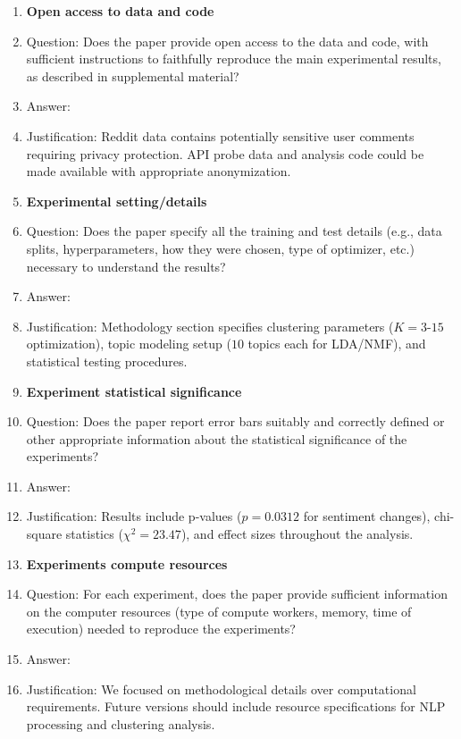\documentclass{article}
\begin{document}
\begin{enumerate}
\item {\bf Open access to data and code}
    \item[] Question: Does the paper provide open access to the data and code, with sufficient instructions to faithfully reproduce the main experimental results, as described in supplemental material?
    \item[] Answer: \answerNo{} 
    \item[] Justification: Reddit data contains potentially sensitive user comments requiring privacy protection. API probe data and analysis code could be made available with appropriate anonymization.

\item {\bf Experimental setting/details}
    \item[] Question: Does the paper specify all the training and test details (e.g., data splits, hyperparameters, how they were chosen, type of optimizer, etc.) necessary to understand the results?
    \item[] Answer: \answerYes{} 
    \item[] Justification: Methodology section specifies clustering parameters ($K=3$-$15$ optimization), topic modeling setup ($10$ topics each for LDA/NMF), and statistical testing procedures.

\item {\bf Experiment statistical significance}
    \item[] Question: Does the paper report error bars suitably and correctly defined or other appropriate information about the statistical significance of the experiments?
    \item[] Answer: \answerYes{} 
    \item[] Justification: Results include p-values ($p=0.0312$ for sentiment changes), chi-square statistics ($\chi^2=23.47$), and effect sizes throughout the analysis.

\item {\bf Experiments compute resources}
    \item[] Question: For each experiment, does the paper provide sufficient information on the computer resources (type of compute workers, memory, time of execution) needed to reproduce the experiments?
    \item[] Answer: \answerNo{} 
    \item[] Justification: We focused on methodological details over computational requirements. Future versions should include resource specifications for NLP processing and clustering analysis.


\end{enumerate}
\end{document}
